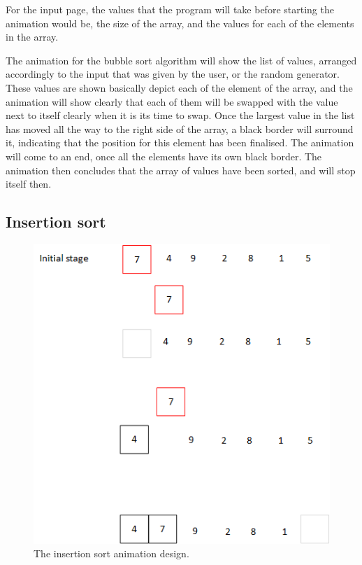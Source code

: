 For the input page, the values that the program will take before starting the animation would be, the size of the array, and the values for each of the elements in the array.

The animation for the bubble sort algorithm will show the list of values, arranged accordingly to the input that was given by the user, or the random generator. These values are shown basically depict each of the element of the array, and the animation will show clearly that each of them will be swapped with the value next to itself clearly when it is its time to swap. Once the largest value in the list has moved all the way to the right side of the array, a black border will surround it, indicating that the position for this element has been finalised. The animation will come to an end, once all the elements have its own black border. The animation then concludes that the array of values have been sorted, and will stop itself then.

\newpage
{}


\newpage

\subsection{Insertion sort}

\begin{figure}[H]
\centering
\includegraphics[scale=0.9]{images/report_images/animationDesignInsertionSort.png}
\caption{The insertion sort animation design.}
\label{animationDesignInsertionSort}
\end{figure}


